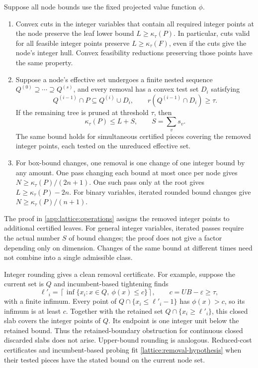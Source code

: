 \begin{theorem}
\label{lattice:operations}
Suppose all node bounds use the fixed projected value function $\phi$.
\begin{enumerate}[label=(\alph*)]
\item Convex cuts in the integer variables that contain all required integer
points at the node preserve the leaf lower bound
$L\ge\kappa_\tau(P)$. In particular, cuts valid for all feasible integer
points preserve $L\ge\kappa_\tau(F)$, even if the cuts give the node's
integer hull. Convex feasibility reductions preserving those points have
the same property.
\item Suppose a node's effective set undergoes a finite nested sequence
$Q^{(0)}\supseteq\cdots\supseteq Q^{(s)}$, and every removal has a convex
test set $D_i$ satisfying
\begin{equation}
 Q^{(i-1)}\cap P\subseteq Q^{(i)}\cup D_i,
 \qquad r(Q^{(i-1)}\cap D_i)\ge\tau.
 \label{lattice:removal-hypothesis}
\end{equation}
If the remaining tree is pruned at threshold $\tau$, then
\begin{equation}
 \kappa_\tau(P)\le L+S,
 \qquad S=\sum_v s_v.
 \label{lattice:augmented-count}
\end{equation}
The same bound holds for simultaneous certified pieces covering the removed
integer points, each tested on the unreduced effective set.
\item For box-bound changes, one removal is one change of one integer bound
by any amount. One pass changing each bound at most once per node gives
$N\ge\kappa_\tau(P)/(2n+1)$. One such pass only at the root gives
$L\ge\kappa_\tau(P)-2n$. For binary variables, iterated rounded bound
changes give $N\ge\kappa_\tau(P)/(n+1)$.
\end{enumerate}
\end{theorem}

The proof in \cref{app:lattice:operations} assigns the removed integer
points to additional certified leaves. For general integer variables,
iterated passes require the actual number $S$ of bound changes; the proof
does not give a factor depending only on dimension. Changes of the same
bound at different times need not combine into a single admissible class.

Integer rounding gives a clean removal certificate. For example, suppose
the current set is $Q$ and incumbent-based tightening finds
\begin{equation*}
 \ell'_i=\left\lceil\inf\{x_i:x\in Q,\ \phi(x)\le c\}\right\rceil,
 \qquad c=UB-\varepsilon\ge\tau,
\end{equation*}
with a finite infimum. Every point of
$Q\cap\{x_i\le\ell'_i-1\}$ has $\phi(x)>c$, so its infimum is at least
$c$. Together with the retained set $Q\cap\{x_i\ge\ell'_i\}$, this closed
slab covers the integer points of $Q$. Its endpoint is one integer unit
below the retained bound. Thus the retained-boundary obstruction for
continuous closed discarded slabs does not arise. Upper-bound rounding is
analogous. Reduced-cost certificates and incumbent-based probing fit
\eqref{lattice:removal-hypothesis} when their tested pieces have the stated
bound on the current node set.

